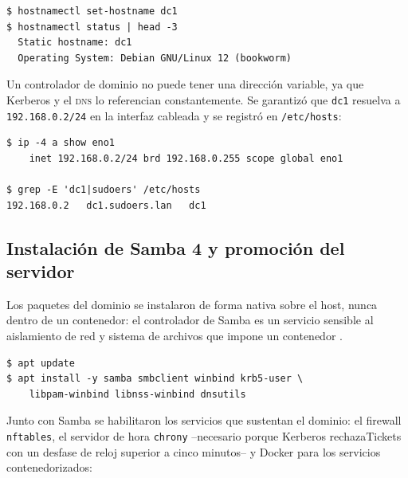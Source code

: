 \begin{lstlisting}[style=terminal]
$ hostnamectl set-hostname dc1
$ hostnamectl status | head -3
  Static hostname: dc1
  Operating System: Debian GNU/Linux 12 (bookworm)
\end{lstlisting}


Un controlador de dominio no puede tener una direcci\'on variable, ya que
Kerberos y el \textsc{dns} lo referencian constantemente. Se garantiz\'o que
\texttt{dc1} resuelva a \texttt{192.168.0.2/24} en la interfaz cableada y se
registr\'o en \texttt{/etc/hosts}:

\begin{lstlisting}[style=terminal]
$ ip -4 a show eno1
    inet 192.168.0.2/24 brd 192.168.0.255 scope global eno1

$ grep -E 'dc1|sudoers' /etc/hosts
192.168.0.2   dc1.sudoers.lan   dc1
\end{lstlisting}


\subsection{Instalaci\'on de Samba 4 y promoci\'on del servidor}

Los paquetes del dominio se instalaron de forma nativa sobre el host, nunca
dentro de un contenedor: el controlador de Samba es un servicio sensible al
aislamiento de red y sistema de archivos que impone un contenedor
\cite{sambateam2024}.

\begin{lstlisting}[style=terminal]
$ apt update
$ apt install -y samba smbclient winbind krb5-user \
    libpam-winbind libnss-winbind dnsutils
\end{lstlisting}

Junto con Samba se habilitaron los servicios que sustentan el dominio:
el firewall \texttt{nftables}, el servidor de hora \texttt{chrony}
--necesario porque Kerberos rechazaTickets con un desfase de reloj superior
a cinco minutos-- y Docker para los servicios contenedorizados:

